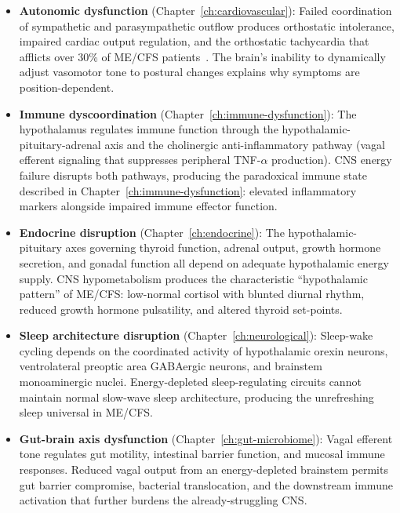 \begin{itemize}
    \item \textbf{Autonomic dysfunction} (Chapter~\ref{ch:cardiovascular}): Failed coordination of sympathetic and parasympathetic outflow produces orthostatic intolerance, impaired cardiac output regulation, and the orthostatic tachycardia that afflicts over 30\% of ME/CFS patients~\cite{Hoad2008pots,Yu2022}. The brain's inability to dynamically adjust vasomotor tone to postural changes explains why symptoms are position-dependent.

    \item \textbf{Immune dyscoordination} (Chapter~\ref{ch:immune-dysfunction}): The hypothalamus regulates immune function through the hypothalamic-pituitary-adrenal axis and the cholinergic anti-inflammatory pathway (vagal efferent signaling that suppresses peripheral TNF-$\alpha$ production). CNS energy failure disrupts both pathways, producing the paradoxical immune state described in Chapter~\ref{ch:immune-dysfunction}: elevated inflammatory markers alongside impaired immune effector function.

    \item \textbf{Endocrine disruption} (Chapter~\ref{ch:endocrine}): The hypothalamic-pituitary axes governing thyroid function, adrenal output, growth hormone secretion, and gonadal function all depend on adequate hypothalamic energy supply. CNS hypometabolism produces the characteristic ``hypothalamic pattern'' of ME/CFS: low-normal cortisol with blunted diurnal rhythm, reduced growth hormone pulsatility, and altered thyroid set-points.

    \item \textbf{Sleep architecture disruption} (Chapter~\ref{ch:neurological}): Sleep-wake cycling depends on the coordinated activity of hypothalamic orexin neurons, ventrolateral preoptic area GABAergic neurons, and brainstem monoaminergic nuclei. Energy-depleted sleep-regulating circuits cannot maintain normal slow-wave sleep architecture, producing the unrefreshing sleep universal in ME/CFS.

    \item \textbf{Gut-brain axis dysfunction} (Chapter~\ref{ch:gut-microbiome}): Vagal efferent tone regulates gut motility, intestinal barrier function, and mucosal immune responses. Reduced vagal output from an energy-depleted brainstem permits gut barrier compromise, bacterial translocation, and the downstream immune activation that further burdens the already-struggling CNS.
\end{itemize}

